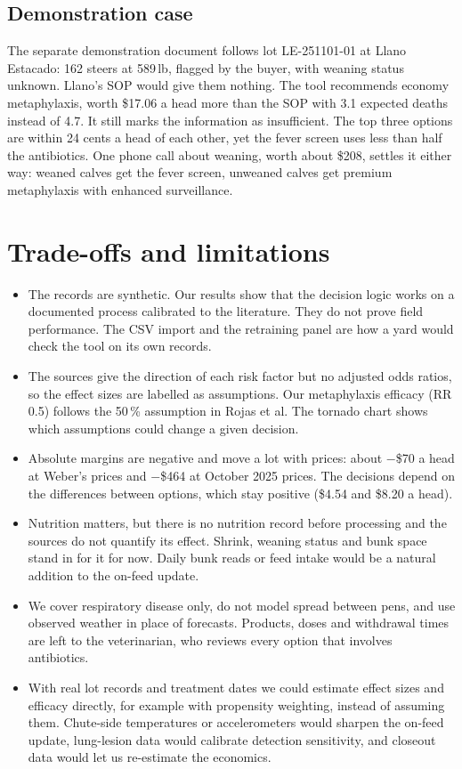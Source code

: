 \documentclass[10pt,letterpaper]{article}
\newcommand{\pct}{\,\%}
\newcommand{\usd}[1]{\$#1}
\begin{document}
\subsection{Demonstration case}
The separate demonstration document follows lot LE-251101-01 at Llano Estacado: 162 steers at 589\,lb, flagged by the buyer, with weaning status unknown. Llano's SOP would give them nothing. The tool recommends economy metaphylaxis, worth \usd{17.06} a head more than the SOP with 3.1 expected deaths instead of 4.7. It still marks the information as insufficient. The top three options are within 24 cents a head of each other, yet the fever screen uses less than half the antibiotics. One phone call about weaning, worth about \usd{208}, settles it either way: weaned calves get the fever screen, unweaned calves get premium metaphylaxis with enhanced surveillance.

\section{Trade-offs and limitations}

\begin{itemize}
  \item The records are synthetic. Our results show that the decision logic works on a documented process calibrated to the literature. They do not prove field performance. The CSV import and the retraining panel are how a yard would check the tool on its own records.
  \item The sources give the direction of each risk factor but no adjusted odds ratios, so the effect sizes are labelled as assumptions. Our metaphylaxis efficacy (RR 0.5) follows the 50\pct{} assumption in Rojas et al. The tornado chart shows which assumptions could change a given decision.
  \item Absolute margins are negative and move a lot with prices: about $-$\usd{70} a head at Weber's prices and $-$\usd{464} at October 2025 prices. The decisions depend on the differences between options, which stay positive (\usd{4.54} and \usd{8.20} a head).
  \item Nutrition matters, but there is no nutrition record before processing and the sources do not quantify its effect. Shrink, weaning status and bunk space stand in for it for now. Daily bunk reads or feed intake would be a natural addition to the on-feed update.
  \item We cover respiratory disease only, do not model spread between pens, and use observed weather in place of forecasts. Products, doses and withdrawal times are left to the veterinarian, who reviews every option that involves antibiotics.
  \item With real lot records and treatment dates we could estimate effect sizes and efficacy directly, for example with propensity weighting, instead of assuming them. Chute-side temperatures or accelerometers would sharpen the on-feed update, lung-lesion data would calibrate detection sensitivity, and closeout data would let us re-estimate the economics.
\end{itemize}
\end{document}

